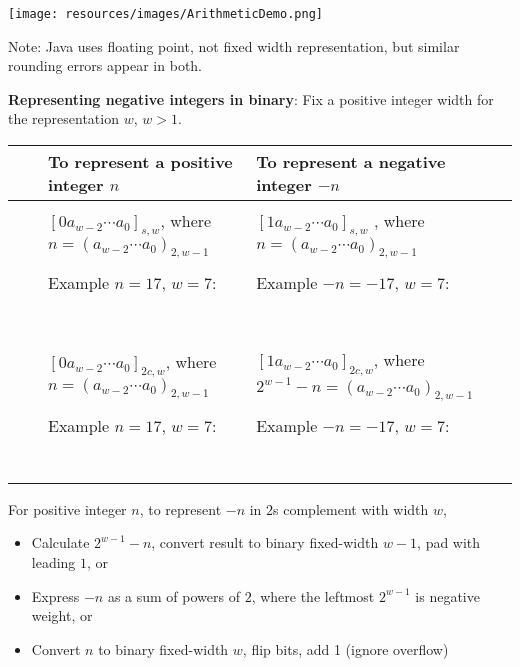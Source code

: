 \documentclass[12pt, oneside]{article}
\begin{document}
\texttt{[image: resources/images/ArithmeticDemo.png]}

Note: Java uses floating point, not fixed width representation, but similar rounding errors appear in both.
 \newpage


{\bf Representing negative integers in binary}: Fix a positive integer  width for the representation  $w$, $w >1$.

\begin{tabular}{|cc|p{3.4in}|p{3.7in}|}
\hline
& & To  represent a positive integer $n$ & To represent a negative integer $-n$\\
\hline
&& &  \\
&\parbox[t]{2mm}{} &
$[ 0a_{w-2} \cdots a_0]_{s,w}$, where $n =  (a_{w-2} \cdots a_0)_{2,w-1}$& 
$[1a_{w-2} \cdots a_0]_{s,w}$
, where $n =  (a_{w-2} \cdots a_0)_{2,w-1}$\\
&& & \\
&& Example $n=17$, $w=7$:  & Example $-n=-17$, $w=7$: \\
&& & \\
&& & \\
&& & \\
&& & \\
&& & \\
&& & \\
&& & \\
\hline
&&  &  \\
&\parbox[t]{2mm}{} &
$[0a_{w-2} \cdots a_0]_{2c,w}$, where $n =  (a_{w-2} \cdots a_0)_{2,w-1}$& $[1a_{w-2} \cdots a_0]_{2c,w}$, where $2^{w-1} - n =  (a_{w-2} \cdots a_0)_{2,w-1}$\\
&& & \\
&& Example $n=17$, $w=7$:  & Example $-n=-17$, $w=7$: \\
&& & \\
&& & \\
&& & \\
&& & \\
&& & \\
&& & \\
&& & \\
\hline
\end{tabular} 

For positive integer $n$, to represent $-n$ in 
$2$s complement with width $w$,
\begin{itemize}
    \item Calculate $2^{w-1} - n$, convert 
    result to binary fixed-width $w-1$, pad 
    with leading $1$, or
    \item Express $-n$ as a sum of powers of $2$, 
    where the leftmost $2^{w-1}$ is negative weight, or
    \item Convert $n$ to binary fixed-width $w$, 
    flip bits, add 1 (ignore overflow)
\end{itemize}
\end{document}
